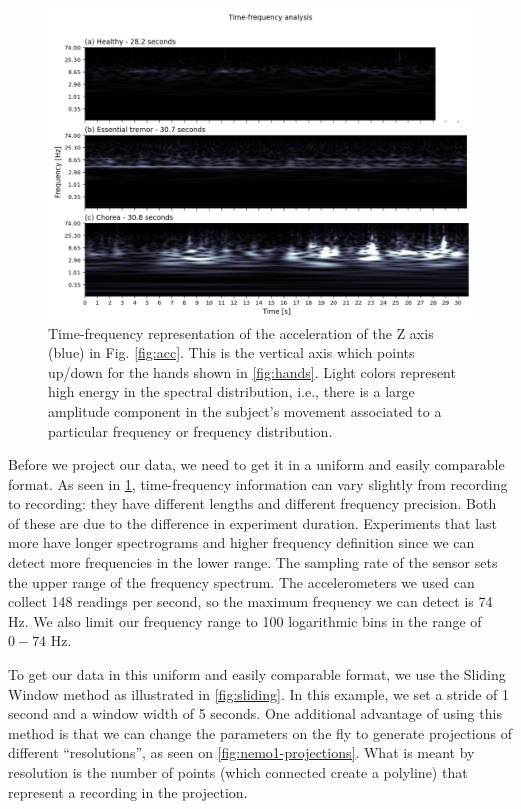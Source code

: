 
\begin{figure}[ht]
\centering
\includegraphics[width=\linewidth]{figures/nemo/freq2.png}
\caption{Time-frequency representation of the acceleration of the Z axis (blue) in Fig. \ref{fig:acc}. This is the vertical axis which points up/down for the hands shown in \cref{fig:hands}. Light colors represent high energy in the spectral distribution, i.e., there is a large amplitude component in the subject's movement associated to a particular frequency or frequency distribution. }
\label{fig:freq}
\end{figure}

Before we project our data, we need to get it in a uniform and easily comparable format. As seen in \cref{fig:freq}, time-frequency information can vary slightly from recording to recording: they have different lengths and different frequency precision. Both of these are due to the difference in experiment duration. Experiments that last more have longer spectrograms and higher frequency definition since we can detect more frequencies in the lower range. The sampling rate of the sensor sets the upper range of the frequency spectrum. The accelerometers we used can collect 148 readings per second, so the maximum frequency we can detect is 74 Hz. We also limit our frequency range to 100 logarithmic bins in the range of $0-74$ Hz. 

To get our data in this uniform and easily comparable format, we use the Sliding Window method as illustrated in \cref{fig:sliding}. In this example, we set a stride of 1 second and a window width of 5 seconds. One additional advantage of using this method is that we can change the parameters on the fly to generate projections of different ``resolutions'', as seen on \cref{fig:nemo1-projections}. What is meant by resolution is the number of points (which connected create a polyline) that represent a recording in the projection.


